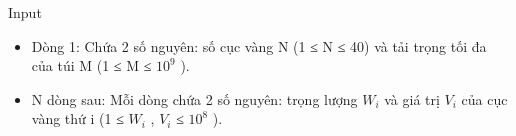 Input
\begin{itemize}
	\item     Dòng 1: Chứa 2 số nguyên: số cục vàng N (1 ≤ N ≤ 40) và tải trọng tối đa của túi M (1 ≤ M ≤ $10^{9}$    ).   
	\item     N dòng sau: Mỗi dòng chứa 2 số nguyên: trọng lượng $W_{i}$    và giá trị $V_{i}$    của cục vàng thứ i (1 ≤ $W_{i}$    , $V_{i}$    ≤ $10^{8}$    ).   
\end{itemize}